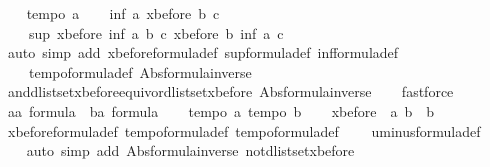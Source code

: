 \begin{isabellebody}
\ \ \isamarkupfalse%
\ {\isachardoublequoteopen}tempo{}\ a{\isachardoublequoteclose}\isanewline
\ \ \isamarkupfalse%
\ {\isachardoublequoteopen}inf\ a\ {\isacharparenleft}xbefore\ b\ c{\isacharparenright}\ {\isacharequal}\ \isanewline
\ \ \ \ sup\ {\isacharparenleft}xbefore\ {\isacharparenleft}inf\ a\ b{\isacharparenright}\ c{\isacharparenright}\ {\isacharparenleft}xbefore\ b\ {\isacharparenleft}inf\ a\ c{\isacharparenright}{\isacharparenright}{\isachardoublequoteclose}\isanewline
\ \ \isamarkupfalse%
\ {\isacharparenleft}auto\ simp\ add{\isacharcolon}\ xbefore{\isacharunderscore}formula{\isacharunderscore}def\ sup{\isacharunderscore}formula{\isacharunderscore}def\ inf{\isacharunderscore}formula{\isacharunderscore}def\ \isanewline
\ \ \ \ tempo{}{\isacharunderscore}formula{\isacharunderscore}def\ Abs{\isacharunderscore}formula{\isacharunderscore}inverse{\isacharparenright}\isanewline
\ \ \isamarkupfalse%
\ and{\isacharunderscore}dlistset{\isacharunderscore}xbefore{\isacharunderscore}equiv{\isacharunderscore}or{\isacharunderscore}dlistset{\isacharunderscore}xbefore\ Abs{\isacharunderscore}formula{\isacharunderscore}inverse\isanewline
\ \ \isamarkupfalse%
\ fastforce\isanewline
\ \ \isamarkupfalse%
\isanewline
\ \ \isamarkupfalse%
\ a{\isacharcolon}{\isacharcolon}{\isachardoublequoteopen}{\isacharprime}a\ formula{\isachardoublequoteclose}\ \ b{\isacharcolon}{\isacharcolon}{\isachardoublequoteopen}{\isacharprime}a\ formula{\isachardoublequoteclose}\isanewline
\ \ \isamarkupfalse%
\ {\isachardoublequoteopen}tempo{}\ a{\isachardoublequoteclose}\ {\isachardoublequoteopen}tempo{}\ b{\isachardoublequoteclose}\isanewline
\ \ \isamarkupfalse%
\ {\isachardoublequoteopen}xbefore\ {\isacharparenleft}{\isacharminus}\ a{\isacharparenright}\ b\ {\isacharequal}\ b{\isachardoublequoteclose}\isanewline
\ \ \isamarkupfalse%
\ xbefore{\isacharunderscore}formula{\isacharunderscore}def\ tempo{}{\isacharunderscore}formula{\isacharunderscore}def\ tempo{}{\isacharunderscore}formula{\isacharunderscore}def\isanewline
\ \ \ \ uminus{\isacharunderscore}formula{\isacharunderscore}def\ \isanewline
\ \ \isamarkupfalse%
\ {\isacharparenleft}auto\ simp\ add{\isacharcolon}\ Abs{\isacharunderscore}formula{\isacharunderscore}inverse\ not{\isacharunderscore}{}{\isacharunderscore}dlistset{\isacharunderscore}xbefore\ \isanewline

\end{isabellebody}

